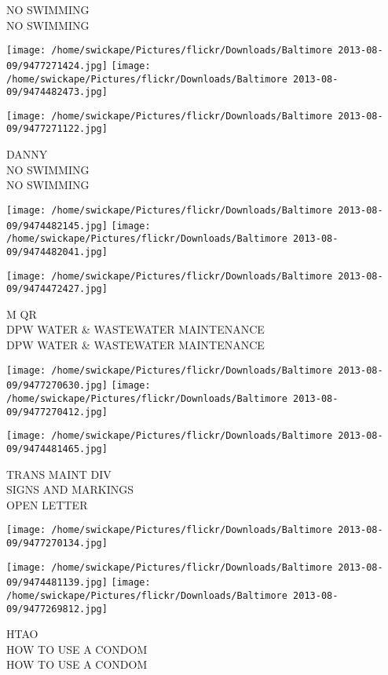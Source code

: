 \documentclass[10pt,letterpaper]{article}
\begin{document}
NO SWIMMING\\
NO SWIMMING
\pagebreak

\texttt{[image: /home/swickape/Pictures/flickr/Downloads/Baltimore 2013-08-09/9477271424.jpg]}
\texttt{[image: /home/swickape/Pictures/flickr/Downloads/Baltimore 2013-08-09/9474482473.jpg]}

\vspace{0.25in}
\texttt{[image: /home/swickape/Pictures/flickr/Downloads/Baltimore 2013-08-09/9477271122.jpg]}

DANNY\\
NO SWIMMING\\
NO SWIMMING
\pagebreak

\texttt{[image: /home/swickape/Pictures/flickr/Downloads/Baltimore 2013-08-09/9474482145.jpg]}
\texttt{[image: /home/swickape/Pictures/flickr/Downloads/Baltimore 2013-08-09/9474482041.jpg]}

\vspace{0.25in}
\texttt{[image: /home/swickape/Pictures/flickr/Downloads/Baltimore 2013-08-09/9474472427.jpg]}

M QR\\
DPW WATER \& WASTEWATER MAINTENANCE\\
DPW WATER \& WASTEWATER MAINTENANCE
\pagebreak

\texttt{[image: /home/swickape/Pictures/flickr/Downloads/Baltimore 2013-08-09/9477270630.jpg]}
\texttt{[image: /home/swickape/Pictures/flickr/Downloads/Baltimore 2013-08-09/9477270412.jpg]}

\texttt{[image: /home/swickape/Pictures/flickr/Downloads/Baltimore 2013-08-09/9474481465.jpg]}

TRANS MAINT DIV\\
SIGNS AND MARKINGS\\
OPEN LETTER
\pagebreak

\texttt{[image: /home/swickape/Pictures/flickr/Downloads/Baltimore 2013-08-09/9477270134.jpg]}

\vspace{0.25in}
\texttt{[image: /home/swickape/Pictures/flickr/Downloads/Baltimore 2013-08-09/9474481139.jpg]}
\texttt{[image: /home/swickape/Pictures/flickr/Downloads/Baltimore 2013-08-09/9477269812.jpg]}

HTAO\\
HOW TO USE A CONDOM\\
HOW TO USE A CONDOM
\pagebreak
\end{document}
